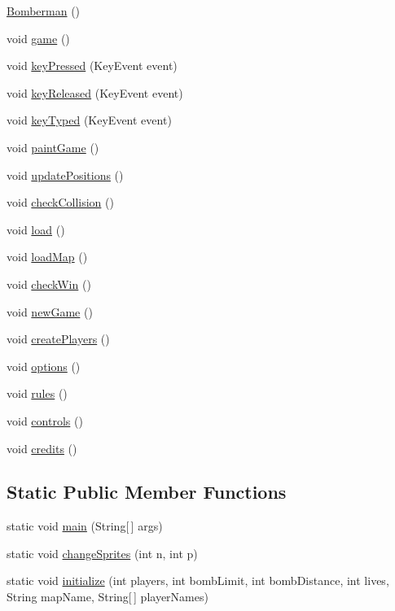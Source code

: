 \begin{DoxyCompactItemize}
\item 
\hyperlink{class_bomberman_a0390d82a8dbb54267eef4596cb204c1d}{Bomberman} ()
\item 
void \hyperlink{class_bomberman_a29623f557fafadd09713225a2f6e5d87}{game} ()
\item 
void \hyperlink{class_bomberman_aa89f0c27a218cccda9e512a45c1c099e}{key\+Pressed} (Key\+Event event)
\item 
void \hyperlink{class_bomberman_a20612b0e0b2e84367cf8d7f784fab962}{key\+Released} (Key\+Event event)
\item 
void \hyperlink{class_bomberman_a103d91b186f26b2da235de94f0c83f14}{key\+Typed} (Key\+Event event)
\item 
void \hyperlink{class_bomberman_a2987174569eb935f3fb627529eeab3ac}{paint\+Game} ()
\item 
void \hyperlink{class_bomberman_a64949794be90ca1f9c049b107df5eaa0}{update\+Positions} ()
\item 
void \hyperlink{class_bomberman_aba4bf2aeb30f417ba905dee10beedbb9}{check\+Collision} ()
\item 
void \hyperlink{class_bomberman_a3bf6f133b8c0769f51329598ed29b349}{load} ()
\item 
void \hyperlink{class_bomberman_a997783f87885a94d051fcb9a5a849f51}{load\+Map} ()
\item 
void \hyperlink{class_bomberman_a957817254c86d8afe45e7fd2b7c09b24}{check\+Win} ()
\item 
void \hyperlink{class_bomberman_ab0267c9e812ce043cb773db037ccd607}{new\+Game} ()
\item 
void \hyperlink{class_bomberman_ab8373491821d3b4a1cbe41da6b700c64}{create\+Players} ()
\item 
void \hyperlink{class_bomberman_a8bbca3ecf284c927ba263441a49574a4}{options} ()
\item 
void \hyperlink{class_bomberman_a91027bf5033c764e3cf0c445fd8bc0d2}{rules} ()
\item 
void \hyperlink{class_bomberman_aac15074008f535fa531f0182ff5bbe23}{controls} ()
\item 
void \hyperlink{class_bomberman_a050561732a7d0e53daa9980a1dbbcbe7}{credits} ()
\end{DoxyCompactItemize}
\subsection*{Static Public Member Functions}
\begin{DoxyCompactItemize}
\item 
static void \hyperlink{class_bomberman_ab69de0e48af8d28ac2e9bdb58b7074ba}{main} (String\mbox{[}$\,$\mbox{]} args)
\item 
static void \hyperlink{class_bomberman_a54fc0c6fdcd64345d6dedf0afdd7310d}{change\+Sprites} (int n, int p)
\item 
static void \hyperlink{class_bomberman_a1f05f0b836a62ece2b3a05ae50f4c8f7}{initialize} (int players, int bomb\+Limit, int bomb\+Distance, int lives, String map\+Name, String\mbox{[}$\,$\mbox{]} player\+Names)
\end{DoxyCompactItemize}
